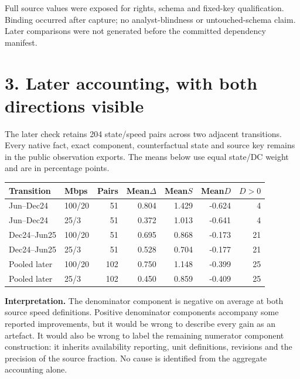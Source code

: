 \documentclass[10pt,letterpaper]{article}
\begin{document}
Full source values were exposed for rights, schema and fixed-key qualification. Binding occurred after capture; no analyst-blindness or untouched-schema claim. Later comparisons were not generated before the committed dependency manifest.
\newpage
\section*{3. Later accounting, with both directions visible}
The later check retains 204 state/speed pairs across two adjacent transitions. Every native fact, exact component, counterfactual state and source key remains in the public observation exports. The means below use equal state/DC weight and are in percentage points.
\begin{center}\small\begin{tabular}{@{}llrrrrr@{}}\toprule
Transition & Mbps & Pairs & Mean$\Delta$ & Mean$S$ & Mean$D$ & $D>0$\\\midrule
Jun--Dec24 & 100/20 & 51 & 0.804 & 1.429 & -0.624 & 4 \\
Jun--Dec24 & 25/3 & 51 & 0.372 & 1.013 & -0.641 & 4 \\
Dec24--Jun25 & 100/20 & 51 & 0.695 & 0.868 & -0.173 & 21 \\
Dec24--Jun25 & 25/3 & 51 & 0.528 & 0.704 & -0.177 & 21 \\
\midrule
Pooled later & 100/20 & 102 & 0.750 & 1.148 & -0.399 & 25 \\
Pooled later & 25/3 & 102 & 0.450 & 0.859 & -0.409 & 25 \\
\bottomrule\end{tabular}\end{center}

\textbf{Interpretation.} The denominator component is negative on average at both source speed definitions. Positive denominator components accompany some reported improvements, but it would be wrong to describe every gain as an artefact. It would also be wrong to label the remaining numerator component construction: it inherits availability reporting, unit definitions, revisions and the precision of the source fraction. No cause is identified from the aggregate accounting alone.
\end{document}
